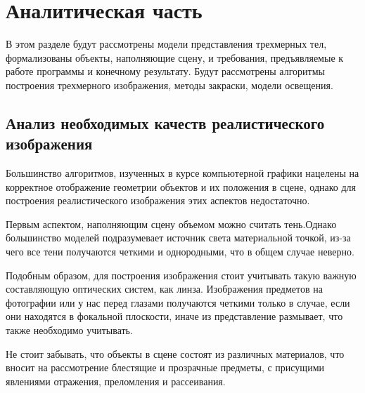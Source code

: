 \section{Аналитическая часть}

В этом разделе будут рассмотрены модели представления трехмерных тел,
формализованы объекты, наполняющие сцену, и требования, предъявляемые к
работе программы и конечному результату. Будут рассмотрены алгоритмы
построения трехмерного изображения, методы закраски, модели освещения.

\subsection{Анализ необходимых качеств реалистического изображения} \label{ssec:necessary_qualities}
Большинство алгоритмов, изученных в курсе компьютерной графики
нацелены на корректное отображение геометрии объектов и их положения в сцене,
однако для построения реалистического изображения этих аспектов недостаточно.

Первым аспектом, наполняющим сцену объемом можно считать тень.Однако
большинство моделей подразумевает источник света материальной точкой, из-за
чего все тени получаются четкими и однородными, что в общем случае неверно.

Подобным образом, для построения изображения стоит учитывать такую
важную составляющую оптических систем, как линза. Изображения предметов на
фотографии или у нас перед глазами получаются четкими только в случае, если они
находятся в фокальной плоскости, иначе из представление размывает, что также
необходимо учитывать.

Не стоит забывать, что объекты в сцене состоят из различных материалов, что
вносит на рассмотрение блестящие и прозрачные предметы, с присущими
явлениями отражения, преломления и рассеивания.

